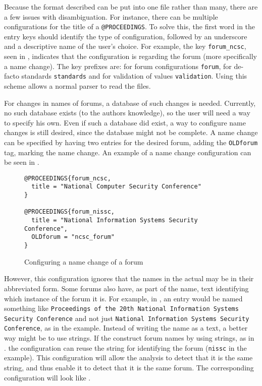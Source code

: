 Because the format described can be put into one file rather than
many, there are a few issues with disambiguation.  For instance, there
can be multiple configurations for the title of a
\texttt{@PROCEEDINGS}.  To solve this, the first word in the entry
keys should identify the type of configuration, followed by an
underscore and a descriptive name of the user's choice.  For example,
the key \texttt{forum\_ncsc}, seen in
, indicates that the
configuration is regarding the forum (more specifically a name
change).  The key prefixes are: for forum configurations
\texttt{forum}, for de-facto standards \texttt{standards} and for
validation of values \texttt{validation}.  Using this scheme allows a
normal {\bibtex} parser to read the files.

For changes in names of forums, a database of such changes is needed.
Currently, no such database exists (to the authors knowledge), so the
user will need a way to specify his own.  Even if such a database did
exist, a way to configure name changes is still desired, since the
database might not be complete.  A name change can be specified by
having two entries for the desired forum, adding the \texttt{OLDforum}
tag, marking the name change.  An example of a name change
configuration can be seen in
.

\begin{figure}
  \centering
\begin{verbatim}
@PROCEEDINGS{forum_ncsc,
  title = "National Computer Security Conference"
}

@PROCEEDINGS{forum_nissc,
  title = "National Information Systems Security Conference",
  OLDforum = "ncsc_forum"
}
\end{verbatim}
  \caption{Configuring a name change of a forum}
  \label{fig:analyzing_configuration_name_change}
\end{figure}

However, this configuration ignores that the names in the actual
 may be in their abbreviated form.  Some forums also have,
as part of the name, text identifying which instance of the forum it
is.  For example, in ,
an entry would be named something like \texttt{Proceedings of the 20th
  National Information Systems Security Conference} and not just
\texttt{National Information Systems Security Conference}, as in the
example.  Instead of writing the name as a text, a better way might be
to use strings.  If the  construct forum names by using
strings, as in
.
the configuration can reuse the string for identifying the forum
(\texttt{nissc} in the example).  This configuration will allow the
analysis to detect that it is the same string, and thus enable it to
detect that it is the same forum.  The corresponding configuration
will look like
.

